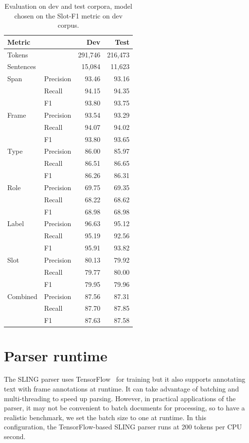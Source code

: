 \documentclass[11pt,a4paper]{article}
\begin{document}
\begin{table}[ht]
\begin{tabular}{|ll|r|r|}
\hline
{\bf Metric} & & {\bf Dev} & {\bf Test} \\
\hline
Tokens & & 291,746  & 216,473  \\
\hline
Sentences &   & 15,084 & 11,623  \\
\hline
\hline
Span & Precision & 93.46  & 93.16 \\
\hline
& Recall & 94.15 & 94.35 \\
\hline
& F1 & 93.80 & 93.75 \\
\hline
Frame & Precision & 93.54 & 93.29 \\
\hline
& Recall & 94.07 & 94.02 \\
\hline
& F1 & 93.80 & 93.65\\
\hline
Type & Precision & 86.00  & 85.97 \\
\hline
& Recall & 86.51 & 86.65 \\
\hline
& F1 & 86.26 & 86.31 \\
\hline
Role & Precision & 69.75 & 69.35 \\
\hline
& Recall & 68.22 & 68.62 \\
\hline
& F1 & 68.98 &68.98 \\
\hline
Label & Precision & 96.63 &95.12 \\
\hline
& Recall & 95.19 & 92.56 \\
\hline
& F1 & 95.91 & 93.82 \\
\hline
Slot & Precision & 80.13 & 79.92 \\
\hline
& Recall & 79.77 & 80.00 \\
\hline
& F1 & 79.95 & 79.96 \\
\hline
Combined & Precision & 87.56 & 87.31 \\
\hline
& Recall & 87.70 & 87.85 \\
\hline
& F1 & 87.63 & 87.58 \\
\hline
\end{tabular}
\caption{Evaluation on dev and test corpora, model 
chosen on the Slot-F1 metric on dev corpus.}
\label{tab:eval}
\end{table}


\section{Parser runtime}

The SLING parser uses TensorFlow~\cite{tensorflow} for training but it also
supports annotating text with frame annotations at runtime. It can take
advantage of batching and multi-threading to speed up parsing. However, in
practical applications of the parser, it may not be convenient to
batch documents for processing, so to have a realistic benchmark, we
set the batch size to one at runtime. In this configuration, the
TensorFlow-based SLING parser runs at 200 tokens per CPU second.
\end{document}
